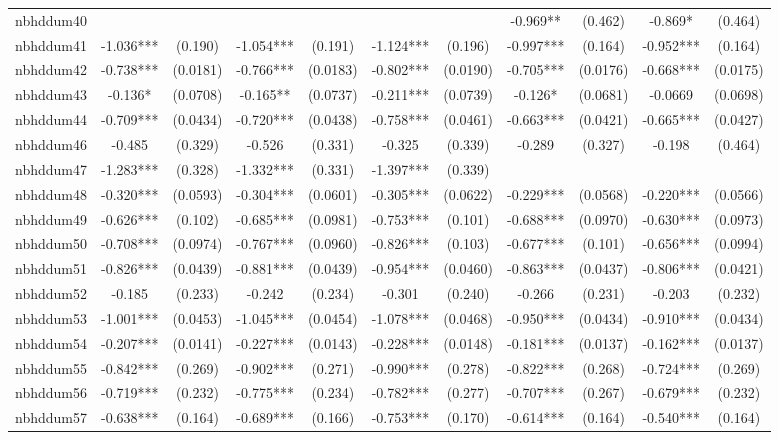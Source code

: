 \documentclass[]{article}
\begin{document}
\begin{tabular}{lcccccccccc}
nbhddum40 &  &  &  &  &  &  & -0.969** & (0.462) & -0.869* & (0.464) \\
nbhddum41 & -1.036*** & (0.190) & -1.054*** & (0.191) & -1.124*** & (0.196) & -0.997*** & (0.164) & -0.952*** & (0.164) \\
nbhddum42 & -0.738*** & (0.0181) & -0.766*** & (0.0183) & -0.802*** & (0.0190) & -0.705*** & (0.0176) & -0.668*** & (0.0175) \\
nbhddum43 & -0.136* & (0.0708) & -0.165** & (0.0737) & -0.211*** & (0.0739) & -0.126* & (0.0681) & -0.0669 & (0.0698) \\
nbhddum44 & -0.709*** & (0.0434) & -0.720*** & (0.0438) & -0.758*** & (0.0461) & -0.663*** & (0.0421) & -0.665*** & (0.0427) \\
nbhddum46 & -0.485 & (0.329) & -0.526 & (0.331) & -0.325 & (0.339) & -0.289 & (0.327) & -0.198 & (0.464) \\
nbhddum47 & -1.283*** & (0.328) & -1.332*** & (0.331) & -1.397*** & (0.339) &  &  &  &  \\
nbhddum48 & -0.320*** & (0.0593) & -0.304*** & (0.0601) & -0.305*** & (0.0622) & -0.229*** & (0.0568) & -0.220*** & (0.0566) \\
nbhddum49 & -0.626*** & (0.102) & -0.685*** & (0.0981) & -0.753*** & (0.101) & -0.688*** & (0.0970) & -0.630*** & (0.0973) \\
nbhddum50 & -0.708*** & (0.0974) & -0.767*** & (0.0960) & -0.826*** & (0.103) & -0.677*** & (0.101) & -0.656*** & (0.0994) \\
nbhddum51 & -0.826*** & (0.0439) & -0.881*** & (0.0439) & -0.954*** & (0.0460) & -0.863*** & (0.0437) & -0.806*** & (0.0421) \\
nbhddum52 & -0.185 & (0.233) & -0.242 & (0.234) & -0.301 & (0.240) & -0.266 & (0.231) & -0.203 & (0.232) \\
nbhddum53 & -1.001*** & (0.0453) & -1.045*** & (0.0454) & -1.078*** & (0.0468) & -0.950*** & (0.0434) & -0.910*** & (0.0434) \\
nbhddum54 & -0.207*** & (0.0141) & -0.227*** & (0.0143) & -0.228*** & (0.0148) & -0.181*** & (0.0137) & -0.162*** & (0.0137) \\
nbhddum55 & -0.842*** & (0.269) & -0.902*** & (0.271) & -0.990*** & (0.278) & -0.822*** & (0.268) & -0.724*** & (0.269) \\
nbhddum56 & -0.719*** & (0.232) & -0.775*** & (0.234) & -0.782*** & (0.277) & -0.707*** & (0.267) & -0.679*** & (0.232) \\
nbhddum57 & -0.638*** & (0.164) & -0.689*** & (0.166) & -0.753*** & (0.170) & -0.614*** & (0.164) & -0.540*** & (0.164) \\

\end{tabular}
\end{document}
